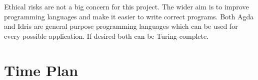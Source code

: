 \documentclass[parskip=half]{scrartcl}
\begin{document}
Ethical risks are not a big concern for this project. The wider aim is to
improve programming languages and make it easier to write correct programs.
Both Agda and Idris are general purpose programming languages which can be
used for every possible application. If desired both can be Turing-complete.



\section{Time Plan}






\end{document}
